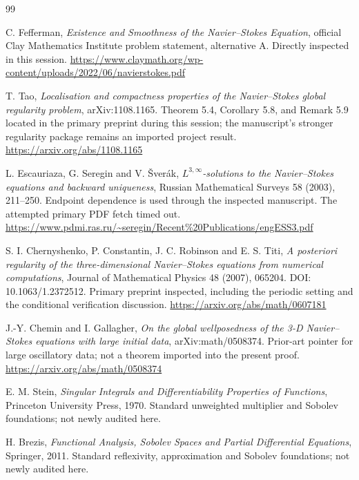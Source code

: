 \documentclass[11pt,a4paper]{article}
\theoremstyle{definition}\newtheorem{definition}[theorem]{Definition}
\theoremstyle{remark}\newtheorem{remark}[theorem]{Remark}
\numberwithin{equation}{section}
\begin{document}
\begin{thebibliography}{99}
 C. Fefferman, \emph{Existence and Smoothness of the Navier--Stokes Equation}, official Clay Mathematics Institute problem statement, alternative A. Directly inspected in this session.\newline
\url{https://www.claymath.org/wp-content/uploads/2022/06/navierstokes.pdf}

 T. Tao, \emph{Localisation and compactness properties of the Navier--Stokes global regularity problem}, arXiv:1108.1165. Theorem 5.4, Corollary 5.8, and Remark 5.9 located in the primary preprint during this session; the manuscript's stronger regularity package remains an imported project result.\newline
\url{https://arxiv.org/abs/1108.1165}

 L. Escauriaza, G. Seregin and V. \v Sver\'ak, \emph{$L^{3,\infty}$-solutions to the Navier--Stokes equations and backward uniqueness}, Russian Mathematical Surveys 58 (2003), 211--250. Endpoint dependence is used through the inspected manuscript. The attempted primary PDF fetch timed out.\newline
\url{https://www.pdmi.ras.ru/~seregin/Recent%20Publications/engESS3.pdf}

 S. I. Chernyshenko, P. Constantin, J. C. Robinson and E. S. Titi, \emph{A posteriori regularity of the three-dimensional Navier--Stokes equations from numerical computations}, Journal of Mathematical Physics 48 (2007), 065204. DOI: 10.1063/1.2372512. Primary preprint inspected, including the periodic setting and the conditional verification discussion.\newline
\url{https://arxiv.org/abs/math/0607181}

 J.-Y. Chemin and I. Gallagher, \emph{On the global wellposedness of the 3-D Navier--Stokes equations with large initial data}, arXiv:math/0508374. Prior-art pointer for large oscillatory data; not a theorem imported into the present proof.\newline
\url{https://arxiv.org/abs/math/0508374}

 E. M. Stein, \emph{Singular Integrals and Differentiability Properties of Functions}, Princeton University Press, 1970. Standard unweighted multiplier and Sobolev foundations; not newly audited here.

 H. Brezis, \emph{Functional Analysis, Sobolev Spaces and Partial Differential Equations}, Springer, 2011. Standard reflexivity, approximation and Sobolev foundations; not newly audited here.


\end{thebibliography}
\end{document}
